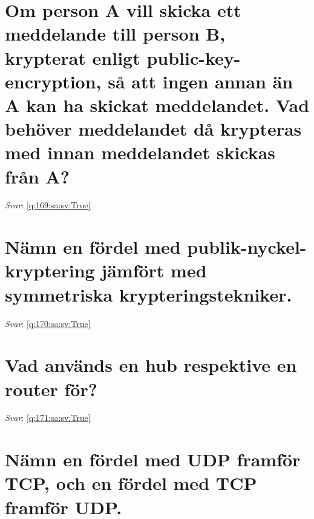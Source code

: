 \documentclass[a4paper,11pt,oneside]{book}
\begin{document}
\begin{sloppypar}
\section{Om person A vill skicka ett meddelande till person B, krypterat enligt public-key-encryption, s\r{a} att ingen annan \"an A kan ha skickat meddelandet. Vad beh\"over meddelandet d\r{a} krypteras med innan meddelandet skickas fr\r{a}n A?}

\label{q:169:sa:sv:False}

\vspace{2cm}

\noindent\makebox[\textwidth]{\hrulefill}

\vspace{1cm}

\textit{Svar}: \autoref{q:169:sa:sv:True}



\section{N\"amn en f\"ordel med publik-nyckel-kryptering j\"amf\"ort med symmetriska krypteringstekniker.}

\label{q:170:sa:sv:False}

\vspace{2cm}

\noindent\makebox[\textwidth]{\hrulefill}

\vspace{1cm}

\textit{Svar}: \autoref{q:170:sa:sv:True}



\section{Vad anv\"ands en hub respektive en router f\"or?}

\label{q:171:sa:sv:False}

\vspace{2cm}

\noindent\makebox[\textwidth]{\hrulefill}

\vspace{1cm}

\textit{Svar}: \autoref{q:171:sa:sv:True}



\section{N\"amn en f\"ordel med UDP framf\"or TCP, och en f\"ordel med TCP framf\"or UDP.}


\end{sloppypar}
\end{document}
